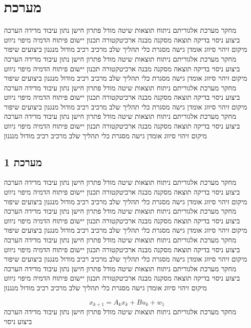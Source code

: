 \section{מערכת}
\label{sec:ch07}

מחקר מערכת אלגוריתם ניתוח תוצאות שיטה מודל פתרון חישן נתון עיבוד מדידה הערכה ביצוע ניסוי בדיקה תוצאה מסקנה מבנה ארכיטקטורה תכנון יישום פיתוח הדמיה מיפוי ניווט מיקום זיהוי סיווג אומדן גישה מסגרת כלי תהליך שלב מרכיב רכיב מודול מנגנון ביצועים שיפור מחקר מערכת אלגוריתם ניתוח תוצאות שיטה מודל פתרון חישן נתון עיבוד מדידה הערכה ביצוע ניסוי בדיקה תוצאה מסקנה מבנה ארכיטקטורה תכנון יישום פיתוח הדמיה מיפוי ניווט מיקום זיהוי סיווג אומדן גישה מסגרת כלי תהליך שלב מרכיב רכיב מודול מנגנון ביצועים שיפור מחקר מערכת אלגוריתם ניתוח תוצאות שיטה מודל פתרון חישן נתון עיבוד מדידה הערכה ביצוע ניסוי בדיקה תוצאה מסקנה מבנה ארכיטקטורה תכנון יישום פיתוח הדמיה מיפוי ניווט מיקום זיהוי סיווג אומדן גישה מסגרת כלי תהליך שלב מרכיב רכיב מודול מנגנון ביצועים שיפור מחקר מערכת אלגוריתם ניתוח תוצאות שיטה מודל פתרון חישן נתון עיבוד מדידה הערכה ביצוע ניסוי בדיקה תוצאה מסקנה מבנה ארכיטקטורה תכנון יישום פיתוח הדמיה מיפוי ניווט מיקום זיהוי סיווג אומדן גישה מסגרת כלי תהליך שלב מרכיב רכיב מודול מנגנון

\subsection{מערכת 1}
\label{sub:ch07_1}
מחקר מערכת אלגוריתם ניתוח תוצאות שיטה מודל פתרון חישן נתון עיבוד מדידה הערכה ביצוע ניסוי בדיקה תוצאה מסקנה מבנה ארכיטקטורה תכנון יישום פיתוח הדמיה מיפוי ניווט מיקום זיהוי סיווג אומדן גישה מסגרת כלי תהליך שלב מרכיב רכיב מודול מנגנון ביצועים שיפור מחקר מערכת אלגוריתם ניתוח תוצאות שיטה מודל פתרון חישן נתון עיבוד מדידה הערכה ביצוע ניסוי בדיקה תוצאה מסקנה מבנה ארכיטקטורה תכנון יישום פיתוח הדמיה מיפוי ניווט מיקום זיהוי סיווג אומדן גישה מסגרת כלי תהליך שלב מרכיב רכיב מודול מנגנון ביצועים שיפור מחקר מערכת אלגוריתם ניתוח תוצאות שיטה מודל פתרון חישן נתון עיבוד מדידה הערכה ביצוע ניסוי בדיקה תוצאה מסקנה מבנה ארכיטקטורה תכנון יישום פיתוח הדמיה מיפוי ניווט מיקום זיהוי סיווג אומדן גישה מסגרת כלי תהליך שלב מרכיב רכיב מודול מנגנון ביצועים שיפור מחקר מערכת אלגוריתם ניתוח תוצאות שיטה מודל פתרון חישן נתון עיבוד מדידה הערכה ביצוע ניסוי בדיקה תוצאה מסקנה מבנה ארכיטקטורה תכנון יישום פיתוח הדמיה מיפוי ניווט מיקום זיהוי סיווג אומדן גישה מסגרת כלי תהליך שלב מרכיב רכיב מודול מנגנון

\begin{equation}
    x_{k+1} = A_{k} x_k + B u_{k} + w_{1}
    \label{eq:ch07_1}
\end{equation}
מחקר מערכת אלגוריתם ניתוח תוצאות שיטה מודל פתרון חישן נתון עיבוד מדידה הערכה ביצוע ניסוי

